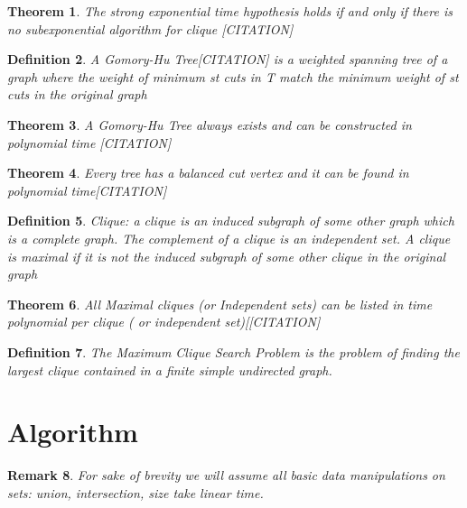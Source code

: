 \documentclass[12pt]{article}
\newtheorem{thm}{Theorem}[section]
\newtheorem{mydef}[thm]{Definition}
\newtheorem{rem}[thm]{Remark}
\begin{document}
\begin{thm}\label{cliquebound} The strong exponential time hypothesis holds if and only if there is no subexponential algorithm for clique [CITATION]\end{thm}

\begin{mydef} A Gomory-Hu Tree[CITATION] is a weighted spanning tree of a graph where the weight of minimum st cuts in T match the minimum weight of st cuts in the original graph\end{mydef}

\begin{thm} \label{GH} A Gomory-Hu Tree always exists and can be constructed in polynomial time [CITATION]\end{thm}

\begin{thm}\label{CT} Every tree has a balanced cut vertex and it can be found in polynomial time[CITATION]\end{thm}

\begin{mydef} Clique: a clique is an induced subgraph of some other graph which is a complete graph. The complement of a clique is an independent set. A clique is maximal if it is not the induced subgraph of some other clique in the original graph\end{mydef}

\begin{thm} All Maximal cliques (or Independent sets) can be listed in time polynomial per clique ( or independent set)[[CITATION]\end{thm} 

\begin{mydef} The Maximum Clique Search Problem is the problem of finding the largest clique contained in a finite simple undirected graph.\end{mydef}

\section{Algorithm}

\begin{rem}\label{brevity} For sake of brevity we will assume all basic data manipulations on sets: union, intersection, size take linear time.
\end{rem}
\end{document}

